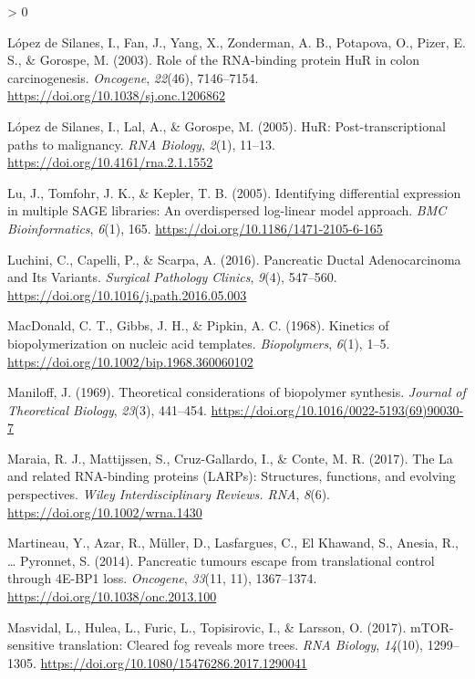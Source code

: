 \documentclass[
  12pt,
  openany]{book}
\newlength{\cslhangindent}
\newenvironment{CSLReferences}[2] %
 {%
  \setlength{\parindent}{0pt}
  \ifodd #1 \everypar{\setlength{\hangindent}{\cslhangindent}}\ignorespaces\fi
  \ifnum #2 > 0
  \setlength{\parskip}{#2\baselineskip}
  \fi
 }%
 {}
\begin{document}
\begin{CSLReferences}{1}{0}
\leavevmode\hypertarget{ref-LopezdeSilanes2003}{}%
López de Silanes, I., Fan, J., Yang, X., Zonderman, A. B., Potapova, O., Pizer, E. S., \& Gorospe, M. (2003). Role of the {RNA}-binding protein {HuR} in colon carcinogenesis. \emph{Oncogene}, \emph{22}(46), 7146--7154. \url{https://doi.org/10.1038/sj.onc.1206862}

\leavevmode\hypertarget{ref-LopezdeSilanes2005}{}%
López de Silanes, I., Lal, A., \& Gorospe, M. (2005). {HuR}: Post-transcriptional paths to malignancy. \emph{RNA Biology}, \emph{2}(1), 11--13. \url{https://doi.org/10.4161/rna.2.1.1552}

\leavevmode\hypertarget{ref-Lu2005}{}%
Lu, J., Tomfohr, J. K., \& Kepler, T. B. (2005). Identifying differential expression in multiple {SAGE} libraries: An overdispersed log-linear model approach. \emph{BMC Bioinformatics}, \emph{6}(1), 165. \url{https://doi.org/10.1186/1471-2105-6-165}

\leavevmode\hypertarget{ref-Luchini2016}{}%
Luchini, C., Capelli, P., \& Scarpa, A. (2016). Pancreatic {Ductal Adenocarcinoma} and {Its Variants}. \emph{Surgical Pathology Clinics}, \emph{9}(4), 547--560. \url{https://doi.org/10.1016/j.path.2016.05.003}

\leavevmode\hypertarget{ref-MacDonald1968}{}%
MacDonald, C. T., Gibbs, J. H., \& Pipkin, A. C. (1968). Kinetics of biopolymerization on nucleic acid templates. \emph{Biopolymers}, \emph{6}(1), 1--5. \url{https://doi.org/10.1002/bip.1968.360060102}

\leavevmode\hypertarget{ref-Maniloff1969}{}%
Maniloff, J. (1969). Theoretical considerations of biopolymer synthesis. \emph{Journal of Theoretical Biology}, \emph{23}(3), 441--454. \url{https://doi.org/10.1016/0022-5193(69)90030-7}

\leavevmode\hypertarget{ref-Maraia2017}{}%
Maraia, R. J., Mattijssen, S., Cruz-Gallardo, I., \& Conte, M. R. (2017). The {La} and related {RNA}-binding proteins ({LARPs}): Structures, functions, and evolving perspectives. \emph{Wiley Interdisciplinary Reviews. RNA}, \emph{8}(6). \url{https://doi.org/10.1002/wrna.1430}

\leavevmode\hypertarget{ref-Martineau2014}{}%
Martineau, Y., Azar, R., Müller, D., Lasfargues, C., El Khawand, S., Anesia, R., \ldots{} Pyronnet, S. (2014). Pancreatic tumours escape from translational control through {4E}-{BP1} loss. \emph{Oncogene}, \emph{33}(11, 11), 1367--1374. \url{https://doi.org/10.1038/onc.2013.100}

\leavevmode\hypertarget{ref-Masvidal2017}{}%
Masvidal, L., Hulea, L., Furic, L., Topisirovic, I., \& Larsson, O. (2017). {mTOR}-sensitive translation: {Cleared} fog reveals more trees. \emph{RNA Biology}, \emph{14}(10), 1299--1305. \url{https://doi.org/10.1080/15476286.2017.1290041}


\end{CSLReferences}
\end{document}
